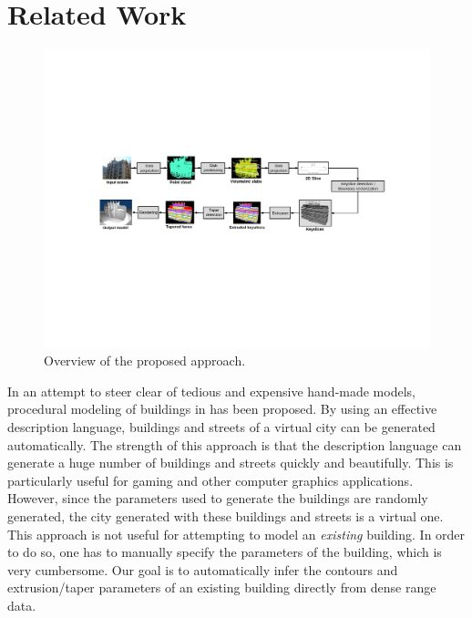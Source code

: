 \documentclass[review]{acmsiggraph}       %
\begin{document}
\section{Related Work}

\begin{figure}[htbp]
\begin{center}
\includegraphics[width=7in]{overview.pdf}
\end{center}
\caption{Overview of the proposed approach.}
\label{fig:ov}
\end{figure}

In an attempt to steer clear of tedious and expensive hand-made models,
procedural modeling of buildings in \cite{PMB_MWH,PMB_WWS,PMB_PM} has been proposed.
By using an effective description language, buildings and streets of a virtual
city can be generated automatically.
The strength of this approach is that the description language can generate
a huge number of buildings and streets quickly and beautifully.
This is particularly useful for gaming and other computer graphics applications.
However, since the parameters used to generate the buildings are randomly
generated, the city generated with these buildings and streets is a virtual one.
This approach is not useful for attempting to model an {\it existing} building.
In order to do so, one has to manually specify the parameters of the building,
which is very cumbersome.
Our goal is to automatically infer the contours and extrusion/taper parameters
of an existing building directly from dense range data.
\end{document}

